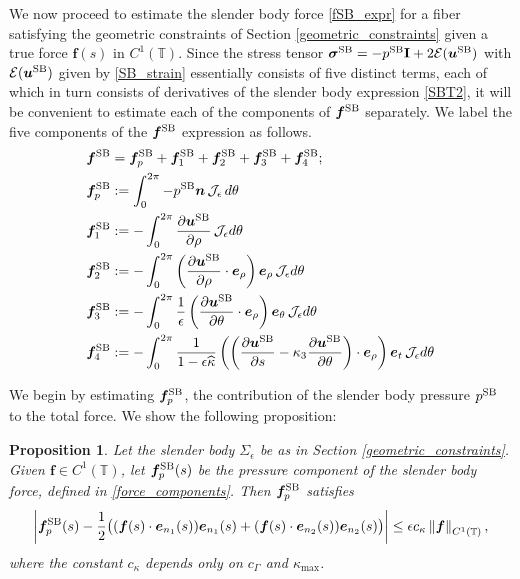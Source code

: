 \documentclass[11pt]{article}
\numberwithin{equation}{section}
\newcommand{\T}{\mathbb{T}}
\newcommand{\E}{\mathcal{E}}
\newcommand{\bu}{\bm{u}}
\newcommand{\be}{\bm{e}}
\newcommand{\p}{\partial}
\newcommand{\ts}{\thinspace}
\newcommand{\SB}{{\rm SB}}
\newcommand{\abs}[1]{\left\lvert #1 \right\rvert}
\newcommand{\norm}[1]{\left\lVert #1 \right\rVert}
\newcommand{\wh}[1]{\widehat{#1}}
\newcommand{\mc}[1]{\mathcal{#1}}
\newtheorem{proposition}[theorem]{Proposition}
\theoremstyle{definition}
\begin{document}
We now proceed to estimate the slender body force \eqref{fSB_expr} for a fiber satisfying the geometric constraints of Section \ref{geometric_constraints} given a true force ${\bm f}(s)$ in $C^1(\T)$. Since the stress tensor $\bm{\sigma}^{\SB} = -p^{\SB}{\bf I}+ 2\E(\bu^{\SB})$ with $\E(\bu^{\SB})$ given by \eqref{SB_strain} essentially consists of five distinct terms, each of which in turn consists of derivatives of the slender body expression \eqref{SBT2}, it will be convenient to estimate each of the components of $\bm{f}^{\SB}$ separately. We label the five components of the $\bm{f}^{\SB}$ expression as follows. 
\begin{equation}\label{force_components}
\begin{aligned}
\bm{f}^{\SB} &= \bm{f}^{\SB}_p + \bm{f}^{\SB}_1 + \bm{f}^{\SB}_2 + \bm{f}^{\SB}_3 + \bm{f}^{\SB}_4; \\
\bm{f}^{\SB}_p &:= \int_0^{2\pi} -p^{\SB}\bm{n} \ts \mc{J}_\epsilon \ts d\theta \\ 
\bm{f}^{\SB}_1 &:= -\int_0^{2\pi}  \frac{\p\bu^{\SB}}{\p\rho} \ts \mc{J}_\epsilon d\theta \\ 
\bm{f}^{\SB}_2 &:=  -\int_0^{2\pi} \left(\frac{\p \bu^{\SB}}{\p \rho}\cdot\be_{\rho}\right)\be_{\rho} \ts \mc{J}_\epsilon d\theta  \\ 
\bm{f}^{\SB}_3 &:= -\int_0^{2\pi} \frac{1}{\epsilon}\left(\frac{\p \bu^{\SB}}{\p \theta}\cdot\be_{\rho} \right)\be_{\theta} \ts \mc{J}_\epsilon d\theta \\ 
\bm{f}^{\SB}_4 &:= -\int_0^{2\pi} \frac{1}{1-\epsilon\wh\kappa}\left(\left(\frac{\p \bu^{\SB}}{\p s}-\kappa_3\frac{\p \bu^{\SB}}{\p\theta}\right)\cdot \be_{\rho}\right) \be_{t}\ts \mc{J}_\epsilon d\theta
\end{aligned}
\end{equation}


We begin by estimating $\bm{f}^{\SB}_p$, the contribution of the slender body pressure $p^{\SB}$ to the total force. We show the following proposition:
\begin{proposition}\label{fSBp_est}
Let the slender body $\Sigma_\epsilon$ be as in Section \ref{geometric_constraints}. Given $\bm{f}\in C^1(\T)$, let $\bm{f}^{\SB}_p(s)$ be the pressure component of the slender body force, defined in \eqref{force_components}. Then $\bm{f}^{\SB}_p$ satisfies
 \begin{equation}
 \abs{\bm{f}^{\SB}_p(s)- \frac{1}{2} \big((\bm{f}(s)\cdot\be_{n_1}(s))\be_{n_1}(s) + (\bm{f}(s)\cdot\be_{n_2}(s))\be_{n_2}(s) \big)} \le \epsilon c_\kappa \norm{\bm{f}}_{C^1(\T)},
 \end{equation}
 where the constant $c_\kappa$ depends only on $c_{\Gamma}$ and $\kappa_{\max}$. 
\end{proposition}
\end{document}
